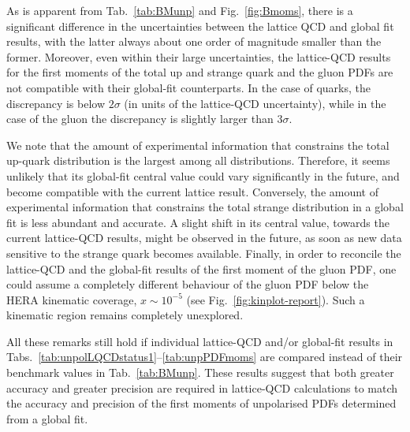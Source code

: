 As is apparent from Tab.~\ref{tab:BMunp} and Fig.~\ref{fig:Bmoms}, there is a 
significant difference in the uncertainties between the lattice QCD and 
global fit results, with the latter always about one order of magnitude 
smaller than the former.
%
Moreover, even within their large uncertainties, the lattice-QCD results 
for the first moments of the total up and strange quark and the gluon PDFs
are not compatible with their global-fit counterparts.
%
In the case of quarks, the discrepancy is below $2\sigma$ (in units of the 
lattice-QCD uncertainty), while in the case of the gluon the discrepancy is
slightly larger than $3\sigma$.

We note that the amount of experimental information that constrains the
total up-quark distribution is the largest among all distributions.
%
Therefore, it seems unlikely that its global-fit central value could vary 
significantly in the future, and become compatible with the current
lattice result.
%
Conversely, the amount of experimental information that constrains the
total strange distribution in a global fit is less abundant and accurate.
%
A slight shift in its central value, towards the current lattice-QCD results,
might be observed in the future, as soon as new data sensitive to the strange 
quark becomes available.
%
Finally, in order to reconcile the lattice-QCD and the global-fit results
of the first moment of the gluon PDF, one could assume a completely
different behaviour of the gluon PDF below the HERA kinematic
coverage, $x\sim 10^{-5}$ (see Fig.~\ref{fig:kinplot-report}).
%
Such a kinematic region remains completely unexplored.

All these remarks still hold if individual lattice-QCD and/or global-fit
results in Tabs.~\ref{tab:unpolLQCDstatus1}--\ref{tab:unpPDFmoms} are 
compared instead of their benchmark values in Tab.~\ref{tab:BMunp}. 
%
These results suggest that both greater accuracy and greater precision are
required in lattice-QCD calculations to match the accuracy and 
precision of the first moments of unpolarised PDFs determined from a global
fit.

